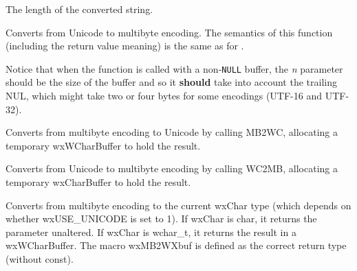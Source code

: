 


The length of the converted string.

\label{wxmbconvwc2mb}


Converts from Unicode to multibyte encoding. The semantics of this function
(including the return value meaning) is the same as for 
.

Notice that when the function is called with a non-{\tt NULL} buffer, the 
{\it n} parameter should be the size of the buffer and so it {\bf should} take
into account the trailing NUL, which might take two or four bytes for some
encodings (UTF-16 and UTF-32).

\label{wxmbconvcmb2wc}


Converts from multibyte encoding to Unicode by calling MB2WC,
allocating a temporary wxWCharBuffer to hold the result.

\label{wxmbconvcwc2mb}


Converts from Unicode to multibyte encoding by calling WC2MB,
allocating a temporary wxCharBuffer to hold the result.

\label{wxmbconvcmb2wx}



Converts from multibyte encoding to the current wxChar type
(which depends on whether wxUSE\_UNICODE is set to 1). If wxChar is char,
it returns the parameter unaltered. If wxChar is wchar\_t, it returns the
result in a wxWCharBuffer. The macro wxMB2WXbuf is defined as the correct
return type (without const).

\label{wxmbconvcwx2mb}

